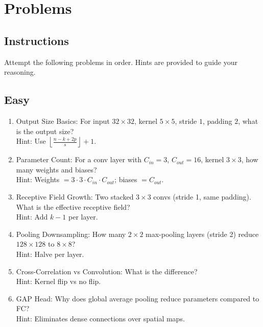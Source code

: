 
\section{Problems }
\label{sec:cnn-problems}

\subsection*{Instructions}
Attempt the following problems in order. Hints are provided to guide your reasoning.

\subsection*{Easy}
\begin{enumerate}[label=E\arabic*.,leftmargin=*]
    \item Output Size Basics: For input $32\times32$, kernel $5\times5$, stride $1$, padding $2$, what is the output size?\\
    Hint: Use $\left\lfloor\frac{n-k+2p}{s}\right\rfloor+1$.
    \item Parameter Count: For a conv layer with $C_{in}=3$, $C_{out}=16$, kernel $3\times3$, how many weights and biases?\\
    Hint: Weights $=3\cdot3\cdot C_{in}\cdot C_{out}$; biases $=C_{out}$.
    \item Receptive Field Growth: Two stacked $3\times3$ convs (stride 1, same padding). What is the effective receptive field?\\
    Hint: Add $k-1$ per layer.
    \item Pooling Downsampling: How many $2\times2$ max-pooling layers (stride 2) reduce $128\times128$ to $8\times8$?\\
    Hint: Halve per layer.
    \item Cross-Correlation vs Convolution: What is the difference?\\
    Hint: Kernel flip vs no flip.
    \item GAP Head: Why does global average pooling reduce parameters compared to FC?\\
    Hint: Eliminates dense connections over spatial maps.
\end{enumerate}

